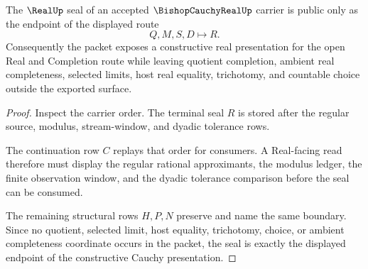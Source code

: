 \begin{theorem}
\label{thm:bishop-cauchy-real-real-seal-boundary}
The $\RealUp$ seal of an accepted $\BishopCauchyRealUp$ carrier is public only as the endpoint of the displayed route
$$
Q,M,S,D \longmapsto R .
$$
Consequently the packet exposes a constructive real presentation for the open Real and Completion route while leaving quotient completion, ambient real completeness, selected limits, host real equality, trichotomy, and countable choice outside the exported surface.
\end{theorem}
\begin{proof}
Inspect the carrier order. The terminal seal $R$ is stored after the regular source, modulus, stream-window, and dyadic tolerance rows.

The continuation row $C$ replays that order for consumers. A Real-facing read therefore must display the regular rational approximants, the modulus ledger, the finite observation window, and the dyadic tolerance comparison before the seal can be consumed.

The remaining structural rows $H,P,N$ preserve and name the same boundary. Since no quotient, selected limit, host equality, trichotomy, choice, or ambient completeness coordinate occurs in the packet, the seal is exactly the displayed endpoint of the constructive Cauchy presentation.
\end{proof}




